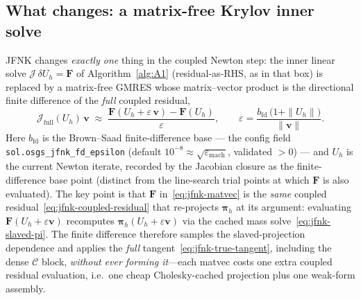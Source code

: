 \documentclass{article}
\newcommand{\code}[1]{\texttt{\small #1}}
\begin{document}
\subsection{What changes: a matrix-free Krylov inner solve}
\label{sec:jfnk-change}

JFNK changes \emph{exactly one} thing in the coupled Newton step: the
inner linear solve $\mathcal{J}\,\delta U_h = \boldsymbol{F}$ of
Algorithm~\ref{alg:A1} (residual-as-RHS, as in that box) is replaced by a
matrix-free GMRES whose matrix--vector product is the directional finite
difference of the \emph{full} coupled residual,
\begin{equation}
    \label{eq:jfnk-matvec}
    \mathcal{J}_{\mathrm{full}}(U_h)\,\boldsymbol{v}
        \;\approx\;
        \frac{\boldsymbol{F}(U_h + \varepsilon\,\boldsymbol{v})
              - \boldsymbol{F}(U_h)}{\varepsilon},
    \qquad
    \varepsilon
        = \frac{b_{\mathrm{fd}}\,
                \bigl(1 + \|U_h\|\bigr)}{\|\boldsymbol{v}\|}.
\end{equation}
Here $b_{\mathrm{fd}}$ is the Brown--Saad finite-difference base --- the
config field \code{sol.osgs\_jfnk\_fd\_epsilon} (default
$10^{-8}\approx\sqrt{\varepsilon_{\mathrm{mach}}}$, validated $>0$) --- and
$U_h$ is the current Newton iterate, recorded by the Jacobian closure as
the finite-difference base point (distinct from the line-search trial
points at which $\boldsymbol{F}$ is also evaluated).
The key point is that $\boldsymbol{F}$ in~\eqref{eq:jfnk-matvec} is the
\emph{same} coupled residual~\eqref{eq:jfnk-coupled-residual} that
re-projects $\boldsymbol{\pi}_h$ at its argument: evaluating
$\boldsymbol{F}(U_h + \varepsilon\boldsymbol{v})$ recomputes
$\boldsymbol{\pi}_h(U_h + \varepsilon\boldsymbol{v})$ via the cached mass
solve~\eqref{eq:jfnk-slaved-pi}. The finite difference therefore
samples the slaved-projection dependence and applies the \emph{full}
tangent~\eqref{eq:jfnk-true-tangent}, including the dense
$\mathcal{C}$ block, \emph{without ever forming it}---each matvec costs
one extra coupled residual evaluation, i.e.\ one cheap
Cholesky-cached projection plus one weak-form assembly.
\end{document}
